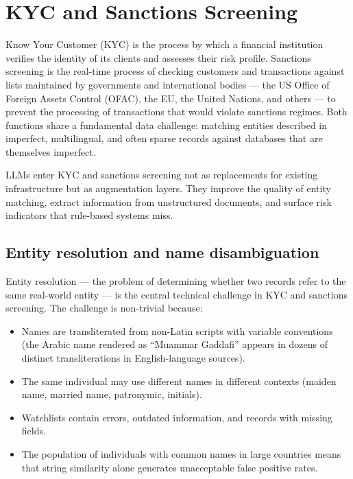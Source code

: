 \section{KYC and Sanctions Screening}
\label{sec:ch11-kyc-sanctions}

\begin{context}
Know Your Customer (KYC) is the process by which a financial institution verifies the identity of its clients and assesses their risk profile. Sanctions screening is the real-time process of checking customers and transactions against lists maintained by governments and international bodies --- the US Office of Foreign Assets Control (OFAC), the EU, the United Nations, and others --- to prevent the processing of transactions that would violate sanctions regimes. Both functions share a fundamental data challenge: matching entities described in imperfect, multilingual, and often sparse records against databases that are themselves imperfect.

LLMs enter KYC and sanctions screening not as replacements for existing infrastructure but as augmentation layers. They improve the quality of entity matching, extract information from unstructured documents, and surface risk indicators that rule-based systems miss.
\end{context}

\subsection{Entity resolution and name disambiguation}
\label{sec:ch11-entity-resolution}

Entity resolution --- the problem of determining whether two records refer to the same real-world entity --- is the central technical challenge in KYC and sanctions screening. The challenge is non-trivial because:
\begin{itemize}
  \item Names are transliterated from non-Latin scripts with variable conventions (the Arabic name rendered as ``Muammar Gaddafi'' appears in dozens of distinct transliterations in English-language sources).
  \item The same individual may use different names in different contexts (maiden name, married name, patronymic, initials).
  \item Watchlists contain errors, outdated information, and records with missing fields.
  \item The population of individuals with common names in large countries means that string similarity alone generates unacceptable false positive rates.
\end{itemize}

